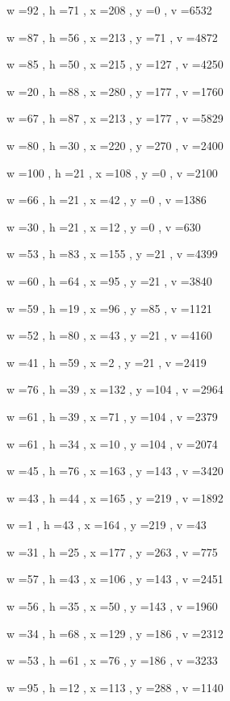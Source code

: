\documentclass[11pt]{article}
\begin{document}
w =92 , h =71 , x =208 , y =0 , v =6532
\par
w =87 , h =56 , x =213 , y =71 , v =4872
\par
w =85 , h =50 , x =215 , y =127 , v =4250
\par
w =20 , h =88 , x =280 , y =177 , v =1760
\par
w =67 , h =87 , x =213 , y =177 , v =5829
\par
w =80 , h =30 , x =220 , y =270 , v =2400
\par
w =100 , h =21 , x =108 , y =0 , v =2100
\par
w =66 , h =21 , x =42 , y =0 , v =1386
\par
w =30 , h =21 , x =12 , y =0 , v =630
\par
w =53 , h =83 , x =155 , y =21 , v =4399
\par
w =60 , h =64 , x =95 , y =21 , v =3840
\par
w =59 , h =19 , x =96 , y =85 , v =1121
\par
w =52 , h =80 , x =43 , y =21 , v =4160
\par
w =41 , h =59 , x =2 , y =21 , v =2419
\par
w =76 , h =39 , x =132 , y =104 , v =2964
\par
w =61 , h =39 , x =71 , y =104 , v =2379
\par
w =61 , h =34 , x =10 , y =104 , v =2074
\par
w =45 , h =76 , x =163 , y =143 , v =3420
\par
w =43 , h =44 , x =165 , y =219 , v =1892
\par
w =1 , h =43 , x =164 , y =219 , v =43
\par
w =31 , h =25 , x =177 , y =263 , v =775
\par
w =57 , h =43 , x =106 , y =143 , v =2451
\par
w =56 , h =35 , x =50 , y =143 , v =1960
\par
w =34 , h =68 , x =129 , y =186 , v =2312
\par
w =53 , h =61 , x =76 , y =186 , v =3233
\par
w =95 , h =12 , x =113 , y =288 , v =1140
\par
\newpage
\end{document}
